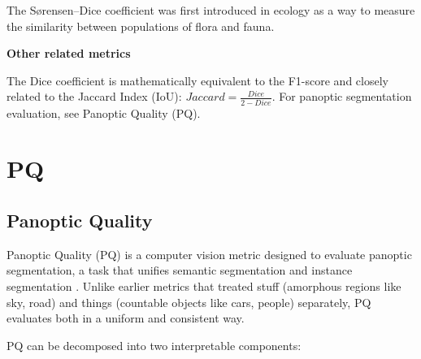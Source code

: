 {The S{\o}rensen–Dice coefficient was first introduced in ecology as a way to measure the similarity
between populations of flora and fauna.}

\textbf{Other related metrics}

The Dice coefficient is mathematically equivalent to the F1-score and closely related to the Jaccard Index (IoU):
$Jaccard = \frac{Dice}{2 - Dice}$. For panoptic segmentation evaluation, see Panoptic Quality (PQ).

\clearpage
\thispagestyle{cvstyle}
\section{PQ}
\subsection{Panoptic Quality}

Panoptic Quality (PQ) is a computer vision metric designed to evaluate panoptic segmentation, a task
that unifies semantic segmentation and instance segmentation . Unlike earlier metrics that treated stuff
(amorphous regions like sky, road) and things (countable objects like cars, people) separately,
PQ evaluates both in a uniform and consistent way.

\begin{center}
\end{center}

PQ can be decomposed into two interpretable components:

